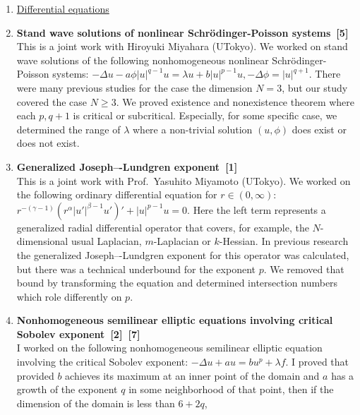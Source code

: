 \begin{enumerate}
 \item[] \underline{Differential equations}
 \item {\bf Stand wave solutions of
       nonlinear Schr\"{o}dinger-Poisson systems~[5]} \\
       This is a joint work with Hiroyuki Miyahara (UTokyo).
       We worked on stand wave solutions
       of the following nonhomogeneous
       nonlinear Schr\"{o}dinger-Poisson systems:
       $-\Delta u -a \phi \left\lvert u \right\rvert^{q-1} u = \lambda u
       + b \left\lvert u \right\rvert^{p-1} u, -\Delta \phi =
       \left\lvert u \right\rvert^{q+1}$.
       There were many previous studies for the case the dimension $N = 3$,
       but our study covered the case $N \geq 3$.
       We proved existence and nonexistence theorem
       where each $p, q+1$ is critical or subcritical.
       Especially, for some specific case,
       we determined the range of $\lambda$ where a non-trivial solution
       $(u, \phi)$ does exist or does not exist.
 \item {\bf Generalized Joseph–-Lundgren exponent~[1]} \\
       This is a joint work with Prof.~Yasuhito Miyamoto (UTokyo).
       We worked on the following ordinary differential equation for $r
       \in (0, \infty)$:
       $r^{-(\gamma-1)} (r^\alpha \lvert u' \rvert^{\beta -1 } u')'
       + \lvert u \rvert^{p-1} u = 0$.
       Here the left term represents
       a generalized radial differential operator
       that covers, for example, the $N$-dimensional
       usual Laplacian, $m$-Laplacian or $k$-Hessian.
       In previous research
       the generalized Joseph–-Lundgren exponent for this operator
       was calculated, but there was a technical underbound for
       the exponent $p$.
       We removed that bound by transforming the equation
       and determined intersection numbers
       which role differently on $p$.
 \item {\bf Nonhomogeneous semilinear elliptic equations involving
       critical Sobolev exponent~[2]~[7]} \\
       I worked on the following
       nonhomogeneous semilinear elliptic equation
       involving the critical Sobolev exponent:
       $-\Delta u + a u = b u^p + \lambda f$.
       I proved that provided 
       $b$ achieves its maximum at an inner point of the
       domain and $a$ has a growth of the exponent $q$
       in some neighborhood of that point, then
       if the dimension of the domain is less than $6 + 2q$,

\end{enumerate}
